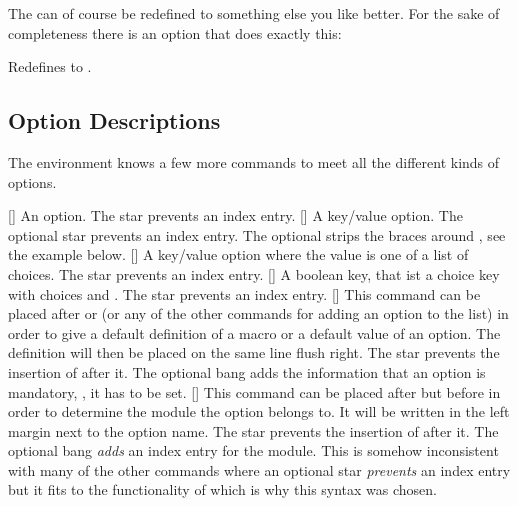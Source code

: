 \documentclass[load-preamble+]{cnltx-doc}
\begin{document}
The  can of course be redefined to something else you like
better.  For the sake of completeness there is an option that does exactly
this:
\begin{options}
    Redefines  to .
\end{options}

\subsection{Option Descriptions}\label{sec:usage:options}
The  environment knows a few more commands to meet all the
different kinds of options.
\begin{commands}
  [\sarg]
    An option.  The star prevents an index entry.
  [\sarg\code{-}]
    A key/value option.  The optional star prevents an index entry.  The
    optional \code{-} strips the braces around , see the example
    below.
  [\sarg{}]
    A key/value option where the value is one of a list of choices.  The star
    prevents an index entry.
  [\sarg{}]
    A boolean key, that ist a choice key with choices  and 
    .  The star prevents an index entry.
  [\sarg\code{!}]
    This command can be placed after  or
     (or any of the other commands for adding an option to the
     list) in order to give a default definition of a macro or a
    default value of an option.  The definition will then be placed on the
    same line flush right.  The star prevents the insertion of 
    after it. The optional bang adds the information that an option is
    mandatory, \ie, it has to be set.
  [\sarg\code{!}]
    This command can be placed after  but before
     in order to determine the module the option belongs to.  It
    will be written in the left margin next to the option name.  The star
    prevents the insertion of  after it.  The optional bang
    \emph{adds} an index entry for the module.  This is somehow inconsistent
    with many of the other commands where an optional star \emph{prevents} an
    index entry but it fits to the functionality of  which is why
    this syntax was chosen.
\end{commands}
\end{document}
